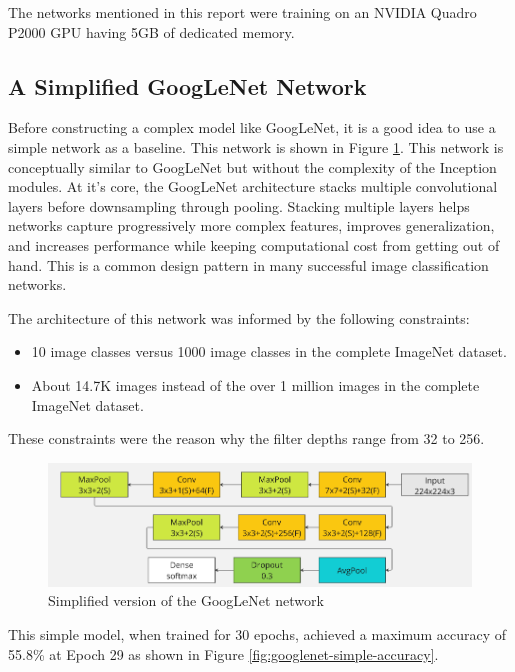\documentclass{article}
\begin{document}
The networks mentioned in this report were training on an NVIDIA Quadro P2000 GPU having 5GB of dedicated memory.

\subsection{A Simplified GoogLeNet Network}
Before constructing a complex model like GoogLeNet, it is a good idea to use a simple network as a baseline. This network is shown in Figure \ref{fig:cnn-simple}. This network is conceptually similar to GoogLeNet but without the complexity of the Inception modules. At it's core, the GoogLeNet architecture stacks multiple convolutional layers before downsampling through pooling. Stacking multiple layers helps networks capture progressively more complex features, improves generalization, and increases performance while keeping computational cost from getting out of hand. This is a common design pattern in many successful image classification networks\cite{simonyan2014very}.

The architecture of this network was informed by the following constraints:
\begin{itemize}
    \item 10 image classes versus 1000 image classes in the complete ImageNet dataset.
    \item About 14.7K images instead of the over 1 million images in the complete ImageNet dataset.
\end{itemize}

These constraints were the reason why the filter depths range from 32 to 256.


\begin{figure}[ht]
    \centering
    \includegraphics[scale=0.7]{project/paper_images/googlenet_simple.png}
    \caption{Simplified version of the GoogLeNet network}
    \label{fig:cnn-simple}
\end{figure}

This simple model, when trained for 30 epochs, achieved a maximum accuracy of 55.8\% at Epoch 29 as shown in Figure \ref{fig:googlenet-simple-accuracy}.
\end{document}
